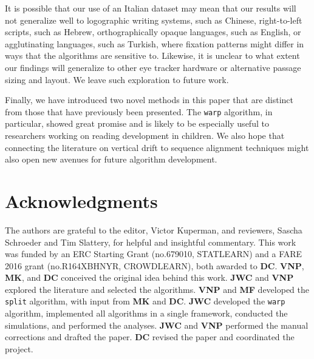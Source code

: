 \documentclass[doc,biblatex]{apa7}
\begin{document}
It is possible that our use of an Italian dataset may mean that our results will not generalize well to logographic writing systems, such as Chinese, right-to-left scripts, such as Hebrew, orthographically opaque languages, such as English, or agglutinating languages, such as Turkish, where fixation patterns might differ in ways that the algorithms are sensitive to. Likewise, it is unclear to what extent our findings will generalize to other eye tracker hardware or alternative passage sizing and layout. We leave such exploration to future work.

Finally, we have introduced two novel methods in this paper that are distinct from those that have previously been presented. The \texttt{warp} algorithm, in particular, showed great promise and is likely to be especially useful to researchers working on reading development in children. We also hope that connecting the literature on vertical drift to sequence alignment techniques might also open new avenues for future algorithm development.


\section{Acknowledgments}

The authors are grateful to the editor, Victor Kuperman, and reviewers, Sascha Schroeder and Tim Slattery, for helpful and insightful commentary. This work was funded by an ERC Starting Grant (no.\@ 679010, STATLEARN) and a FARE 2016 grant (no.\@ R164XBHNYR, CROWDLEARN), both awarded to \textbf{DC}. \textbf{VNP}, \textbf{MK}, and \textbf{DC} conceived the original idea behind this work. \textbf{JWC} and \textbf{VNP} explored the literature and selected the algorithms. \textbf{VNP} and \textbf{MF} developed the \texttt{split} algorithm, with input from \textbf{MK} and \textbf{DC}. \textbf{JWC} developed the \texttt{warp} algorithm, implemented all algorithms in a single framework, conducted the simulations, and performed the analyses. \textbf{JWC} and \textbf{VNP} performed the manual corrections and drafted the paper. \textbf{DC} revised the paper and coordinated the project.





\printbibliography
\end{document}
